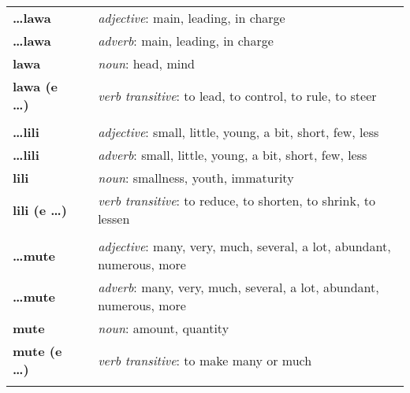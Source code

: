 \begin{supertabular}{p{2,5cm}|ll}
    \textbf{\dots lawa}      &  & \textit{adjective}: main, leading, in charge                                   \\ %
    \textbf{\dots lawa}      &  & \textit{adverb}: main, leading, in charge                                      \\ %
    \textbf{lawa}            &  & \textit{noun}: head, mind                                                      \\ %
    \textbf{lawa (e \dots)}  &  & \textit{verb transitive}: to lead, to control, to rule, to steer               \\ %
                             &  &                                                                                \\ %
    \textbf{\dots lili}      &  & \textit{adjective}: small, little, young, a bit, short, few, less              \\ %
    \textbf{\dots lili}      &  & \textit{adverb}: small, little, young, a bit, short, few, less                 \\ %
    \textbf{lili}            &  & \textit{noun}: smallness, youth, immaturity                                    \\ %
    \textbf{lili (e \dots)}  &  & \textit{verb transitive}: to reduce, to shorten, to shrink, to lessen          \\ %
                             &  &                                                                                \\ %
    \textbf{\dots mute}      &  & \textit{adjective}: many, very, much, several, a lot, abundant, numerous, more \\ %
    \textbf{\dots mute}      &  & \textit{adverb}: many, very, much, several, a lot, abundant, numerous, more    \\ %
    \textbf{mute}            &  & \textit{noun}: amount, quantity                                                \\ %
    \textbf{mute (e \dots)}  &  & \textit{verb transitive}: to make many or much                                 \\ %
                             &  &                                                                                \\ %

\end{supertabular}
